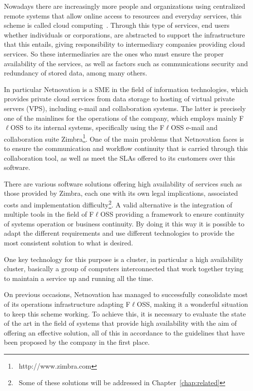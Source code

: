 \documentclass[a4paper, 12pt]{book}
\begin{document}
\noindent Nowadays there are increasingly more people and organizations using centralized remote systems that allow online access to resources and everyday services, this scheme is called cloud computing~\cite{MandG}. Through this type of services, end users whether individuals or corporations, are abstracted to support the infrastructure that this entails, giving responsibility to intermediary companies providing cloud services. So these intermediaries are the ones who must ensure the proper availability of the services, as well as factors such as communications security and redundancy of stored data, among many others.\bigskip

\noindent In particular Netnovation is a SME in the field of information technologies, which provides private cloud services from data storage to hosting of virtual private servers (VPS), including e-mail and collaboration systems. The latter is precisely one of the mainlines for the operations of the company, which employs mainly F$\ell$OSS to its internal systems, specifically using the F$\ell$OSS e-mail and collaboration suite Zimbra\texttrademark\footnote{{\tiny\ http://www.zimbra.com}}. One of the main problems that Netnovation faces is to ensure the communication and workflow continuity that is carried through this collaboration tool, as well as meet the SLAs offered to its customers over this software.\bigskip

\noindent There are various software solutions offering high availability of services such as those provided by Zimbra, each one with its own legal implications, associated costs and implementation difficulty\footnote{{\tiny\ Some of these solutions will be addressed in Chapter~\ref{chap:related}}}. A valid alternative is the integration of multiple tools in the field of F$\ell$OSS providing a framework to ensure  continuity of systems operation or business continuity. By doing it this way it is possible to adapt the different requirements and use different technologies to provide the most consistent solution to what is desired.\bigskip

\noindent One key technology for this purpose is a cluster, in particular a high availability cluster, basically a group of computers interconnected that work together trying to maintain a service up and running all the time.\bigskip

\noindent On previous occasions, Netnovation has managed to successfully consolidate most of its operations infrastructure adapting F$\ell$OSS, making it a wonderful situation to keep this scheme working. To achieve this, it is necessary to evaluate the state of the art in the field of systems that provide high availability with the aim of offering an effective solution, all of this in accordance to the guidelines that have been proposed by the company in the first place.
\end{document}
